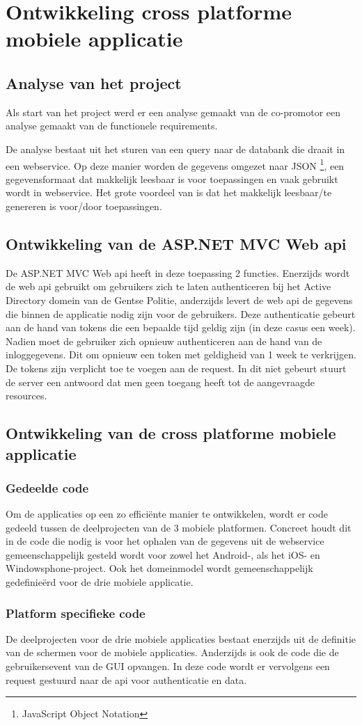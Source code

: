 \chapter{Ontwikkeling cross platforme mobiele applicatie}
\label{ch:ontwikkelingcrossplatformapp}
\section{Analyse van het project}
Als start van het project werd er een analyse gemaakt van de co-promotor
een analyse gemaakt van de functionele requirements.

De analyse bestaat uit het sturen van een query naar de databank die draait in een webservice.
Op deze manier worden de gegevens omgezet naar JSON \footnote{JavaScript Object Notation}, een gegevensformaat dat makkelijk
leesbaar is voor toepassingen en vaak gebruikt wordt in webservice.  Het grote voordeel van \cite{inleidingtotjson}
is dat het makkelijk leesbaar/te genereren is voor/door toepassingen.

\section{Ontwikkeling van de ASP.NET MVC Web api}
De ASP.NET MVC Web api heeft in deze toepassing 2 functies. Enerzijds wordt de web api gebruikt om gebruikers zich te laten
authenticeren bij het Active Directory domein van de Gentse Politie, anderzijds levert de web api de gegevens die binnen
de applicatie nodig zijn voor de gebruikers. Deze authenticatie gebeurt aan de hand van tokens die een bepaalde tijd geldig zijn
(in deze casus een week). Nadien moet de gebruiker zich opnieuw authenticeren aan de hand van de inloggegevens. Dit om opnieuw een
token met geldigheid van 1 week te verkrijgen. De tokens zijn verplicht toe te voegen aan de request. In dit niet gebeurt stuurt
de server een antwoord dat men geen toegang heeft tot de aangevraagde resources.

\section{Ontwikkeling van de cross platforme mobiele applicatie}
\subsection{Gedeelde code}
Om de applicaties op een zo efficiënte manier te ontwikkelen, wordt er code gedeeld tussen de deelprojecten van de 3 mobiele
platformen. Concreet houdt dit in de code die nodig is voor het ophalen van de gegevens uit de webservice gemeenschappelijk
gesteld wordt voor zowel het Android-, als het iOS- en Windowsphone-project. Ook het domeinmodel wordt gemeenschappelijk
gedefinieërd voor de drie mobiele applicatie.

\subsection{Platform specifieke code}
De deelprojecten voor de drie mobiele applicaties bestaat enerzijds uit de definitie van de schermen voor de mobiele applicaties.
Anderzijds is ook de code die de gebruikersevent van de GUI opvangen. In deze code wordt er vervolgens een request gestuurd naar
de api voor authenticatie en data.
